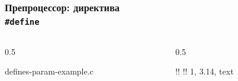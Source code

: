\documentclass[compress, 8pt, aspectratio=169]{beamer}
\begin{document}

\begin{frame}[fragile]

    \frametitle{Препроцессор: директива \\ \texttt{\#define}}

    \begin{columns}[T]

        \begin{column}{0.5\textwidth}

                {defines-param-example.c}

        \end{column}

        \begin{column}{0.5\textwidth}

            \begin{terminalwindow}
!!
!!
1, 3.14, text
            \end{terminalwindow}

        \end{column}

    \end{columns}

\end{frame}

\end{document}
